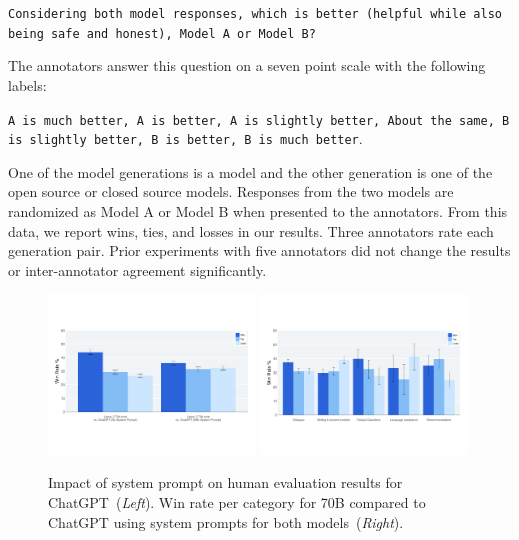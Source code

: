 \texttt{Considering both model responses, which is better (helpful while also being safe and honest), Model A or Model B?}

The annotators answer this question on a seven point scale with the following labels: 

\texttt{A is much better, A is better, A is slightly better, About the same, B is slightly better, B is better, B is much better}. 

One of the model generations is a \modelname model and the other generation is one of the open source or closed source models. Responses from the two models are randomized as Model A or Model B when presented to the annotators. From this data, we report wins, ties, and losses in our results. Three annotators rate each generation pair. Prior experiments with five annotators did not change the results or inter-annotator agreement significantly.


\begin{figure}
    \centering
    \includegraphics[width=0.49\textwidth]{img/human_evals/chatgpt_sys_prompt.pdf}
    \includegraphics[width=0.49\textwidth]{img/human_evals/chatgpt_win_rate_category.pdf}
    \caption{Impact of system prompt on human evaluation results for ChatGPT~(\textit{Left}). Win rate per category for \modelname 70B compared to ChatGPT using system prompts for both models~(\textit{Right}).}
    \label{fig:chat_gpt_sys_propmt}
\end{figure}


